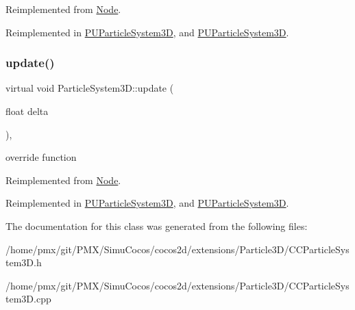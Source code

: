 Reimplemented from \hyperlink{classNode_a32878481ba54b3856ab53c10af13848e}{Node}.



Reimplemented in \hyperlink{classPUParticleSystem3D_a42ba23b8909057126e8a9606f9cd4e8c}{P\+U\+Particle\+System3D}, and \hyperlink{classPUParticleSystem3D_a9fdfe542cd05fcf270644dff49f81857}{P\+U\+Particle\+System3D}.

\mbox{\label{classParticleSystem3D_a446b0819b60fb46ce308e3d17e7625b0}} 
\subsubsection{\texorpdfstring{update()}{update()}\hspace{0.1cm}{\footnotesize\ttfamily [2/2]}}
{\footnotesize\ttfamily virtual void Particle\+System3\+D\+::update (\begin{DoxyParamCaption}\item[{float}]{delta }\end{DoxyParamCaption})\hspace{0.3cm}{\ttfamily [override]}, {\ttfamily [virtual]}}

override function 

Reimplemented from \hyperlink{classNode_a32878481ba54b3856ab53c10af13848e}{Node}.



Reimplemented in \hyperlink{classPUParticleSystem3D_a42ba23b8909057126e8a9606f9cd4e8c}{P\+U\+Particle\+System3D}, and \hyperlink{classPUParticleSystem3D_a9fdfe542cd05fcf270644dff49f81857}{P\+U\+Particle\+System3D}.



The documentation for this class was generated from the following files\+:\begin{DoxyCompactItemize}
\item 
/home/pmx/git/\+P\+M\+X/\+Simu\+Cocos/cocos2d/extensions/\+Particle3\+D/C\+C\+Particle\+System3\+D.\+h\item 
/home/pmx/git/\+P\+M\+X/\+Simu\+Cocos/cocos2d/extensions/\+Particle3\+D/C\+C\+Particle\+System3\+D.\+cpp\end{DoxyCompactItemize}
